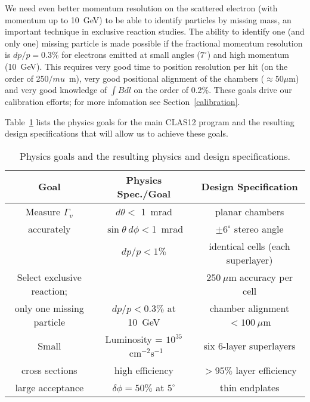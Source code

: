 We need even better momentum resolution on the scattered
electron (with momentum up to 10~GeV) to be able to identify particles
by missing mass, an important technique in exclusive reaction studies.
The ability to identify one (and only one) missing particle is made
possible if the fractional momentum resolution is $dp/p = 0.3\%$ for electrons 
emitted at small angles ($7^{\circ}$) and high momentum (10~GeV).
This requires very good time to position resolution per hit (on the order of 250$/mu$~m),
very good positional alignment of the chambers ($\approx 50\mu$m) and very good knowledge
of $\int Bdl$ on the order of 0.2\%.  These goals drive our calibration efforts; for more
infomation see Section~\ref{calibration}.

Table~\ref{fwd-dc-physics-specifications} lists the physics goals for the main CLAS12 program
and the resulting design specifications that will allow us to achieve these goals.

\small{
\begin{table}[ht]
\begin{center}
\begin{tabular}{||c|c|c||} \hline \hline
   {\bf Goal}         & {\bf Physics Spec./Goal} & {\bf Design Specification}\\ \hline
Measure $\Gamma_v$  & $d \theta <$ 1~mrad   & planar chambers \\ 
accurately  & $\sin \theta ~d \phi < $1~mrad & $\pm 6^\circ$ stereo angle   \\ 
  & $dp/p < 1\% $ & identical cells (each superlayer)  \\ \hline
Select exclusive reaction; &    & $250~\mu$m  accuracy per cell\\ 
only one missing particle    & $dp/p < 0.3\%$ at 10~GeV &    chamber alignment $<100~\mu$m\\  \hline
Small       & Luminosity = $10^{35}$~cm$^{-2}$s$^{-1}$  & six 6-layer superlayers \\ 
cross sections  & high efficiency & $> 95\%$ layer efficiency \\ \hline
large acceptance   & $\delta\phi = 50\%$ at $5^\circ$ & thin endplates\\ \hline
\end{tabular}
\caption{\small{Physics goals and the resulting physics and design specifications.}}
\label{fwd-dc-physics-specifications}
\end{center}
\end{table}
}

